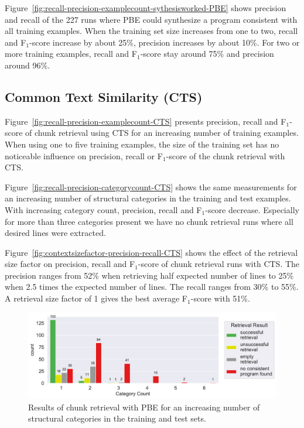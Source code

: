 \documentclass[\myrootdir/main.tex]{subfiles}
\begin{document}
Figure~\ref{fig:recall-precision-examplecount-sythesisworked-PBE} shows precision and recall of the 227 runs where PBE could synthesize a program consistent with all training examples.
When the training set size increases from one to two, recall and F$_{1}$-score increase by about 25\%, precision increases by about 10\%.
For two or more training examples, recall and F$_{1}$-score stay around 75\% and precision around 96\%.


\subsection{Common Text Similarity (CTS)}
Figure~\ref{fig:recall-precision-examplecount-CTS} presents precision, recall and F$_{1}$-score of chunk retrieval using CTS for an increasing number of training examples.
When using one to five training examples, the size of the training set has no noticeable influence on precision, recall or F$_{1}$-score of the chunk retrieval with CTS.

Figure~\ref{fig:recall-precision-categorycount-CTS} shows the same measurements for an increasing number of structural categories in the training and test examples.
With increasing category count, precision, recall and F$_{1}$-score decrease.
Especially for more than three categories present we have no chunk retrieval runs where all desired lines were extracted.

Figure~\ref{fig:contextsizefactor-precision-recall-CTS} shows the effect of the retrieval size factor on precision, recall and F$_{1}$-score of chunk retrieval runs with CTS\@.
The precision ranges from 52\% when retrieving half expected number of lines to 25\% when 2.5 times the expected number of lines.
The recall ranges from 30\% to 55\%.
A retrieval size factor of 1 gives the best average F$_{1}$-score with 51\%.

\begin{figure}[t]
		\centering
		\includegraphics[width=\textwidth, clip]{img/big-study/failure-reason-categorycount-PBE.pdf}
		\caption{Results of chunk retrieval with PBE for an increasing number of structural categories in the training and test sets.}
		\label{fig:failure-reason-categorycount-PBE}
\end{figure}
\end{document}
